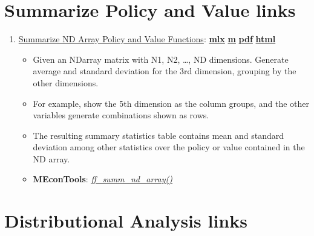 \documentclass[
]{book}
\providecommand{\tightlist}{%
  \setlength{\itemsep}{0pt}\setlength{\parskip}{0pt}}
\begin{document}
\hypertarget{summarize-policy-and-value-links}{%
\section{Summarize Policy and Value links}\label{summarize-policy-and-value-links}}

\begin{enumerate}
\def\labelenumi{\arabic{enumi}.}
\tightlist
\item
  \href{https://fanwangecon.github.io/MEconTools/MEconTools/doc/summ/htmlpdfm/fx_summ_nd_array.html}{Summarize ND Array Policy and Value Functions}: \href{https://github.com/FanWangEcon/MEconTools/blob/master/MEconTools/doc/summ/fx_summ_nd_array.mlx}{\textbf{mlx}} \textbar{} \href{https://github.com/FanWangEcon/MEconTools/blob/master/MEconTools/doc/summ/htmlpdfm/fx_summ_nd_array.m}{\textbf{m}} \textbar{} \href{https://github.com/FanWangEcon/MEconTools/blob/master/MEconTools/doc/summ/htmlpdfm/fx_summ_nd_array.pdf}{\textbf{pdf}} \textbar{} \href{https://fanwangecon.github.io/MEconTools/MEconTools/doc/summ/htmlpdfm/fx_summ_nd_array.html}{\textbf{html}}

  \begin{itemize}
  \tightlist
  \item
    Given an NDarray matrix with N1, N2, \ldots, ND dimensions. Generate average and standard deviation for the 3rd dimension, grouping by the other dimensions.
  \item
    For example, show the 5th dimension as the column groups, and the other variables generate combinations shown as rows.
  \item
    The resulting summary statistics table contains mean and standard deviation among other statistics over the policy or value contained in the ND array.
  \item
    \textbf{MEconTools}: \emph{\href{https://github.com/FanWangEcon/MEconTools/blob/master/MEconTools/summ/ff_summ_nd_array.m}{ff\_summ\_nd\_array()}}
  \end{itemize}
\end{enumerate}

\hypertarget{distributional-analysis-links}{%
\section{Distributional Analysis links}\label{distributional-analysis-links}}
\end{document}
